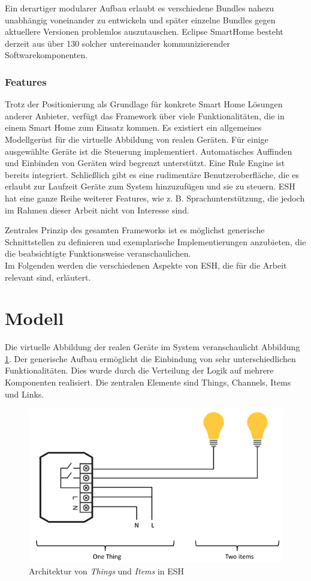 Ein derartiger modularer Aufbau erlaubt es verschiedene Bundles nahezu unabhängig voneinander zu entwickeln und später einzelne Bundles gegen aktuellere Versionen problemlos auszutauschen. Eclipse SmartHome besteht derzeit aus über 130 solcher untereinander kommunizierender Softwarekomponenten.


\subsubsection{Features}
Trotz der Positionierung als Grundlage für konkrete Smart Home Lösungen anderer Anbieter, verfügt das Framework über viele Funktionalitäten, die in einem Smart Home zum Einsatz kommen. Es existiert ein allgemeines Modellgerüst für die virtuelle Abbildung von realen Geräten. Für einige ausgewählte Geräte ist die Steuerung implementiert. Automatisches Auffinden und Einbinden von Geräten wird begrenzt unterstützt. Eine Rule Engine ist bereits integriert. Schließlich gibt es eine rudimentäre Benutzeroberfläche, die es erlaubt zur Laufzeit Geräte zum System hinzuzufügen und sie zu steuern. ESH hat eine ganze Reihe weiterer Features, wie z. B. Sprachunterstützung, die jedoch im Rahmen dieser Arbeit nicht von Interesse sind. 

Zentrales Prinzip des gesamten Frameworks ist es möglichst generische Schnittstellen zu definieren und exemplarische Implementierungen anzubieten, die die beabsichtigte Funktionsweise veranschaulichen. \\

Im Folgenden werden die verschiedenen Aspekte von ESH, die für die Arbeit relevant sind, erläutert.

\section{Modell}
Die virtuelle Abbildung der realen Geräte im System veranschaulicht Abbildung \ref{fig:esh_model}. Der generische Aufbau ermöglicht die Einbindung von sehr unterschiedlichen Funktionalitäten.  Dies wurde durch die Verteilung der Logik auf mehrere Komponenten realisiert. Die zentralen Elemente sind Things, Channels, Items und Links. 

\begin{figure}[h]
	\centering
	\includegraphics[width=\textwidth]{bilder/esh_model}
	\caption{Architektur von \textit{Things} und \textit{Items} in ESH \cite{ESH:home}}
	\label{fig:esh_model}
\end{figure}


